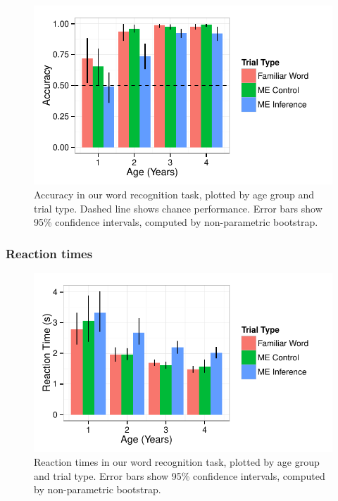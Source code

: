 \documentclass[man,noapacite]{apa2}
\begin{document}
\begin{figure}[t] 
  \begin{center} 
    \includegraphics[width=5in]{figures/accuracy.pdf} 
    \caption{\label{fig:accuracy} Accuracy in our word recognition task, plotted by age group and trial type. Dashed line shows chance performance. Error bars show 95\% confidence intervals, computed by non-parametric bootstrap. }
  \end{center} 
\end{figure}

\subsubsection{Reaction times}

\begin{figure}[t] 
  \begin{center} 
    \includegraphics[width=5in]{figures/rt.pdf} 
    \caption{\label{fig:rt} Reaction times in our word recognition task, plotted by age group and trial type. Error bars show 95\% confidence intervals, computed by non-parametric bootstrap.}
  \end{center} 
\end{figure}
\end{document}
